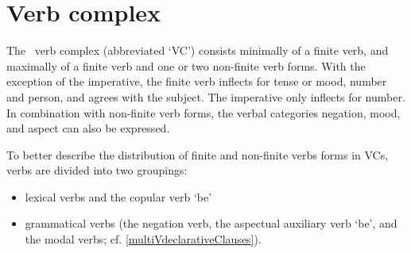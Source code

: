 \section{Verb complex}\label{verbComplex}
The \PS\ verb complex (abbreviated ‘VC’) consists minimally of a finite verb, and maximally of a finite verb and one or two non-finite verb forms. 
With the exception of the imperative, the finite verb inflects for tense or mood, number and person, and agrees with the subject. 
The imperative only inflects for number. %
%
In combination with non-finite verb forms, the verbal categories negation, mood, and aspect can also be expressed. 

To better describe the distribution of finite and non-finite verbs forms in VCs, verbs are divided into two groupings: %
\begin{itemize}
\item{lexical verbs and the copular verb  ‘be’}
\item{grammatical verbs (the negation verb, the aspectual auxiliary verb  ‘be’, and the modal verbs; cf. \SEC\ref{multiVdeclarativeClauses}).}
\end{itemize} 

